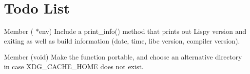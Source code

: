 \chapter{Todo List}
\hypertarget{todo}{}\label{todo}

\begin{DoxyRefList}
\item[Member \doxylink{main_8c_ab4bcf6908817f7fb2303080122c2c5e0}{cli\+\_\+interpreter} (\doxylink{structlenv__t}{lenv\+\_\+t} \texorpdfstring{$\ast$}{*}env)]\label{todo__todo000001}%
%
Include a print\+\_\+info() method that prints out Lispy version and exiting as well as build information (date, time, libc version, compiler version). 
\item[Member \doxylink{main_8c_aadcdb38d3064679ab74180a4629d969c}{prepare\+\_\+logfile} (void)]\label{todo__todo000002}%
%
Make the function portable, and choose an alternative directory in case XDG\+\_\+\+CACHE\+\_\+\+HOME does not exist.
\end{DoxyRefList}